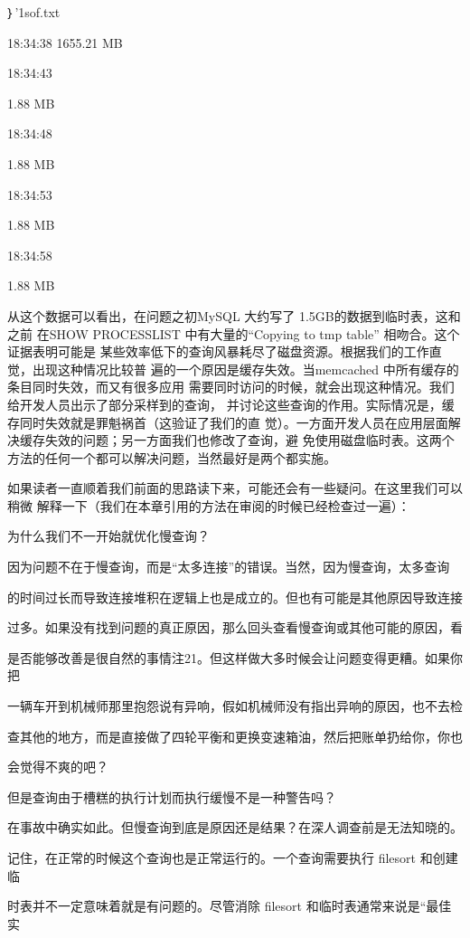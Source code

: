 {｝'1sof.txt

18:34:38 1655.21 MB

18:34:43

1.88 MB

18:34:48

1.88 MB

18:34:53

1.88 MB

18:34:58

1.88 MB

从这个数据可以看出，在问题之初MySQL 大约写了 1.5GB的数据到临时表，这和之前
在SHOW PROCESSLIST 中有大量的“Copying to tmp table” 相吻合。这个证据表明可能是
某些效率低下的查询风暴耗尽了磁盘资源。根据我们的工作直觉，出现这种情况比较普
遍的一个原因是缓存失效。当memcached 中所有缓存的条目同时失效，而又有很多应用
需要同时访问的时候，就会出现这种情况。我们给开发人员出示了部分采样到的查询，
并讨论这些查询的作用。实际情况是，缓存同时失效就是罪魁祸首（这验证了我们的直
觉）。一方面开发人员在应用层面解决缓存失效的问题；另一方面我们也修改了查询，避
免使用磁盘临时表。这两个方法的任何一个都可以解决问题，当然最好是两个都实施。

如果读者一直顺着我们前面的思路读下来，可能还会有一些疑问。在这里我们可以稍微
解释一下（我们在本章引用的方法在审阅的时候已经检查过一遍）：

为什么我们不一开始就优化慢查询？

因为问题不在于慢查询，而是“太多连接”的错误。当然，因为慢查询，太多查询

的时间过长而导致连接堆积在逻辑上也是成立的。但也有可能是其他原因导致连接

过多。如果没有找到问题的真正原因，那么回头查看慢查询或其他可能的原因，看

是否能够改善是很自然的事情注21。但这样做大多时候会让问题变得更糟。如果你把

一辆车开到机械师那里抱怨说有异响，假如机械师没有指出异响的原因，也不去检

查其他的地方，而是直接做了四轮平衡和更换变速箱油，然后把账单扔给你，你也

会觉得不爽的吧？

但是查询由于槽糕的执行计划而执行缓慢不是一种警告吗？

在事故中确实如此。但慢查询到底是原因还是结果？在深人调查前是无法知晓的。

记住，在正常的时候这个查询也是正常运行的。一个查询需要执行 filesort 和创建临

时表并不一定意味着就是有问题的。尽管消除 filesort 和临时表通常来说是“最佳实

}
